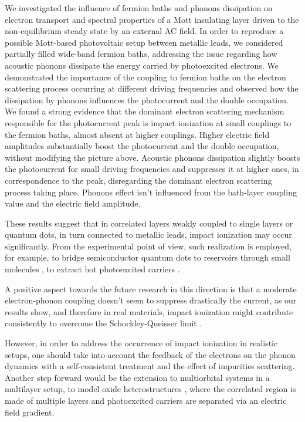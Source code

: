 \documentclass[aps,prb,groupedaddress,showpacs,twocolumn,superscriptaddress,10pt]{revtex4-2}
\begin{document}
We investigated the influence of fermion baths and phonons dissipation on electron transport and spectral properties of a Mott insulating layer driven to the non-equilibrium
steady state by an external AC field. In order to reproduce a possible Mott-based photovoltaic setup between metallic leads, we considered partially filled wide-band fermion baths, addressing the issue regarding how acoustic phonons dissipate the energy carried by photoexcited electrons. We demonstrated the importance of the coupling to fermion baths on the electron scattering process occurring at different driving frequencies and observed how the dissipation by phonons influences the photocurrent and the double occupation. We found a strong evidence that the dominant electron scattering mechanism responsible for the photocurrent peak is impact ionization at small couplings to the fermion baths, almost absent at higher couplings. Higher electric field amplitudes substantially boost the photocurrent and the double occupation, without modifying the picture above. Acoustic phonons dissipation slightly boosts the photocurrent for small driving frequencies and suppresses it at higher ones, in correspondence to the peak, disregarding the dominant electron scattering process taking place. Phonons effect isn't influenced from the bath-layer coupling value and the electric field amplitude.

 
These results suggest that in correlated layers weakly coupled to single layers or quantum dots, in turn connected to metallic leads, impact ionization may occur significantly. From the experimental point of view, such realization is employed, for example, to bridge semiconductor quantum dots to reservoirs through small molecules \cite{wa.mc.13,wa.bo.17}, to extract hot photoexcited carriers \cite{ti.ke.10,ca.wa.16}. 

A positive aspect towards the future research in this direction is that a moderate electron-phonon coupling doesn't seem to suppress drastically the current, as our results show, and therefore in real materials, impact ionization might contribute consistently to overcome the Schockley-Queisser limit \cite{sh.qu.61}.  
 
However, in order to address the occurrence of impact ionization in realistic setups, one should take into account the feedback of the electrons on the phonon dynamics with a self-consistent treatment and the effect of impurities scattering. Another step forward would be the extension to multiorbital systems \cite{pe.be.19} in a multilayer setup, to model oxide heterostructures \cite{as.bl.13,pe.be.19}, where the correlated region is made of multiple layers and photoexcited carriers are separated via an electric field gradient.
\end{document}
